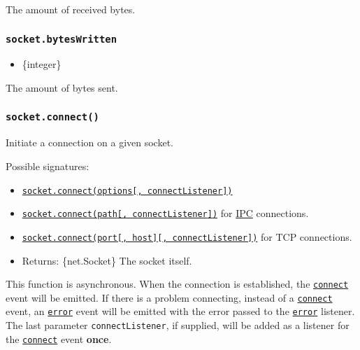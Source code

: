 The amount of received bytes.

\subsubsection{\texorpdfstring{\texttt{socket.bytesWritten}}{socket.bytesWritten}}\label{socket.byteswritten}

\begin{itemize}
\tightlist
\item
  \{integer\}
\end{itemize}

The amount of bytes sent.

\subsubsection{\texorpdfstring{\texttt{socket.connect()}}{socket.connect()}}\label{socket.connect}

Initiate a connection on a given socket.

Possible signatures:

\begin{itemize}
\tightlist
\item
  \hyperref[socketconnectoptions-connectlistener]{\texttt{socket.connect(options{[},\ connectListener{]})}}
\item
  \hyperref[socketconnectpath-connectlistener]{\texttt{socket.connect(path{[},\ connectListener{]})}}
  for \hyperref[ipc-support]{IPC} connections.
\item
  \hyperref[socketconnectport-host-connectlistener]{\texttt{socket.connect(port{[},\ host{]}{[},\ connectListener{]})}}
  for TCP connections.
\item
  Returns: \{net.Socket\} The socket itself.
\end{itemize}

This function is asynchronous. When the connection is established, the
\hyperref[event-connect]{\texttt{\textquotesingle{}connect\textquotesingle{}}}
event will be emitted. If there is a problem connecting, instead of a
\hyperref[event-connect]{\texttt{\textquotesingle{}connect\textquotesingle{}}}
event, an
\hyperref[event-error_1]{\texttt{\textquotesingle{}error\textquotesingle{}}}
event will be emitted with the error passed to the
\hyperref[event-error_1]{\texttt{\textquotesingle{}error\textquotesingle{}}}
listener. The last parameter \texttt{connectListener}, if supplied, will
be added as a listener for the
\hyperref[event-connect]{\texttt{\textquotesingle{}connect\textquotesingle{}}}
event \textbf{once}.

